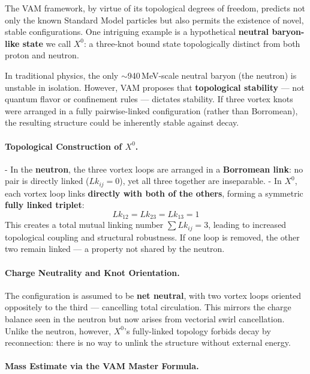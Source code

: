 \documentclass[a4paper,12pt]{article}
\begin{document}
The VAM framework, by virtue of its topological degrees of freedom, predicts not only the known Standard Model particles but also permits the existence of novel, stable configurations. One intriguing example is a hypothetical \textbf{neutral baryon-like state} we call $X^0$: a three-knot bound state topologically distinct from both proton and neutron.

In traditional physics, the only $\sim$940\,MeV-scale neutral baryon (the neutron) is unstable in isolation. However, VAM proposes that \textbf{topological stability} — not quantum flavor or confinement rules — dictates stability. If three vortex knots were arranged in a fully pairwise-linked configuration (rather than Borromean), the resulting structure could be inherently stable against decay.

\paragraph{Topological Construction of $X^0$.}

- In the \textbf{neutron}, the three vortex loops are arranged in a \textbf{Borromean link}: no pair is directly linked ($Lk_{ij}=0$), yet all three together are inseparable.
- In $X^0$, each vortex loop links \textbf{directly with both of the others}, forming a symmetric \textbf{fully linked triplet}:
  \[
  Lk_{12} = Lk_{23} = Lk_{13} = 1
  \]
  This creates a total mutual linking number $\sum Lk_{ij} = 3$, leading to increased topological coupling and structural robustness. If one loop is removed, the other two remain linked — a property not shared by the neutron.

\paragraph{Charge Neutrality and Knot Orientation.}

The configuration is assumed to be \textbf{net neutral}, with two vortex loops oriented oppositely to the third — cancelling total circulation. This mirrors the charge balance seen in the neutron but now arises from vectorial swirl cancellation. Unlike the neutron, however, $X^0$’s fully-linked topology forbids decay by reconnection: there is no way to unlink the structure without external energy.

\paragraph{Mass Estimate via the VAM Master Formula.}
\end{document}

